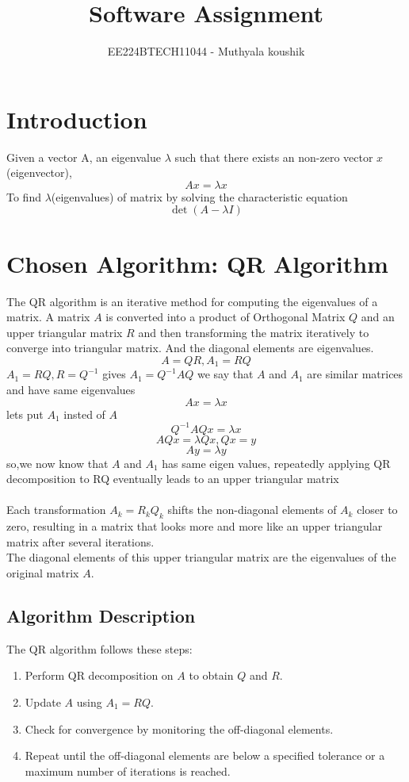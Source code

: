 \documentclass{article}
\theoremstyle{remark}
\begin{document}

\vspace{3cm}

\title{Software Assignment}
\author{EE224BTECH11044 - Muthyala koushik%
}
\date{}
\maketitle
\bigskip

\renewcommand{\thefigure}{\theenumi}
\renewcommand{\thetable}{\theenumi}

\section{Introduction}
Given a vector A, an eigenvalue $\lambda$ such that there exists an non-zero vector $x$(eigenvector),$$Ax=\lambda x$$ To find $\lambda$(eigenvalues) of matrix by solving the characteristic equation $$\det(A-\lambda I)$$

\section{Chosen Algorithm: QR Algorithm}
The QR algorithm is an iterative method for computing the eigenvalues of a matrix. A matrix $A$ is converted into a product of Orthogonal Matrix $Q$ and an upper triangular matrix $R$ and then transforming the matrix iteratively to converge into triangular matrix. And the diagonal elements are eigenvalues.\\
$$A=QR,A_1=RQ$$
$A_1=RQ,R=Q^{-1}$ gives $A_1=Q^{-1}AQ$ we say that $A$ and $A_1$ are similar matrices and have same eigenvalues
$$Ax=\lambda x$$
lets put $A_1$ insted of $A$
$$Q^{-1}AQx=\lambda x$$
$$AQx=\lambda Qx,Qx=y$$
$$Ay=\lambda y$$
so,we now know that $A$ and $A_1$ has same eigen values, repeatedly applying QR decomposition to RQ eventually leads to  an upper triangular matrix \\\\
Each transformation $A_k=R_kQ_k$ shifts the non-diagonal elements of $A_k$ closer to zero, resulting in a matrix that looks more and more like an upper triangular matrix after several iterations. \\
The diagonal elements of this upper triangular matrix are the eigenvalues of the original matrix $A$.

\subsection{Algorithm Description}
The QR algorithm follows these steps:
\begin{enumerate}
    \item Perform QR decomposition on $A$ to obtain $Q$  and $R$.
    \item Update $A$ using $A_1 = RQ$.
    \item Check for convergence by monitoring the off-diagonal elements.
    \item Repeat until the off-diagonal elements are below a specified tolerance or a maximum number of iterations is reached.
\end{enumerate}
\end{document}
